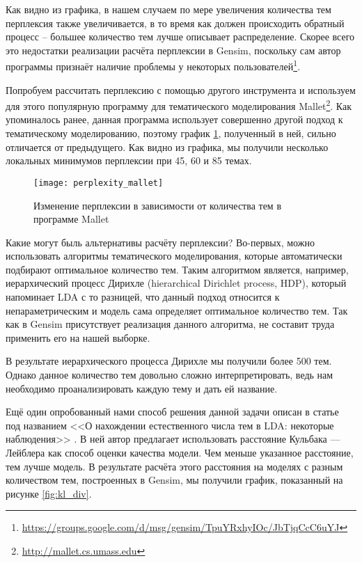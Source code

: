 Как видно из графика, в нашем случаем по мере увеличения количества тем перплексия также увеличивается, в то время как должен происходить обратный процесс -- большее количество тем лучше описывает распределение. Скорее всего это недостатки реализации расчёта перплексии в Gensim, поскольку сам автор программы признаёт наличие проблемы у некоторых пользователей\footnote{\href{https://groups.google.com/d/msg/gensim/TpuYRxhyIOc/JbTjqCcC6uYJ}{https://groups.google.com/d/msg/gensim/TpuYRxhyIOc/JbTjqCcC6uYJ}}.

Попробуем рассчитать перплексию с помощью другого инструмента и используем для этого популярную программу для тематического моделирования Mallet\footnote{\href{http://mallet.cs.umass.edu}{http://mallet.cs.umass.edu}}. Как упоминалось ранее, данная программа использует совершенно другой подход к тематическому моделированию, поэтому график \ref{fig:perplexity_mallet}, полученный в ней, сильно отличается от предыдущего. Как видно из графика, мы получили несколько локальных минимумов перплексии при 45, 60 и 85 темах.

\begin{figure}
	\centering
    \texttt{[image: perplexity\_mallet]}
    \caption{Изменение перплексии в зависимости от количества тем в программе Mallet}
    \label{fig:perplexity_mallet}
\end{figure}

Какие могут быль альтернативы расчёту перплексии? Во-первых, можно использовать алгоритмы тематического моделирования, которые автоматически подбирают оптимальное количество тем. Таким алгоритмом является, например, иерархический процесс Дирихле (hierarchical Dirichlet process, HDP), который напоминает LDA с то разницей, что данный подход относится к непараметрическим и модель сама определяет оптимальное количество тем. Так как в Gensim присутствует реализация данного алгоритма, не составит труда применить его на нашей выборке.

В результате иерархического процесса Дирихле мы получили более 500 тем. Однако данное количество тем довольно сложно интерпретировать, ведь нам необходимо проанализировать каждую тему и дать ей название.

Ещё один опробованный нами способ решения данной задачи описан в статье под названием <<О нахождении естественного числа тем в LDA: некоторые наблюдения>> \cite{Arun_KL}. В ней автор предлагает использовать расстояние Кульбака — Лейблера как способ оценки качества модели. Чем меньше указанное расстояние, тем лучше модель. В результате расчёта этого расстояния на моделях с разным количеством тем, построенных в Gensim, мы получили график, показанный на рисунке \ref{fig:kl_div}.

